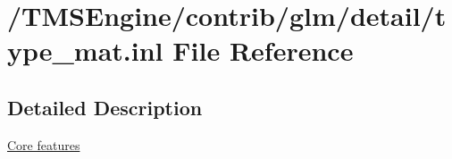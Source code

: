 \hypertarget{type__mat_8inl}{}\section{/\+T\+M\+S\+Engine/contrib/glm/detail/type\+\_\+mat.inl File Reference}
\label{type__mat_8inl}


\subsection{Detailed Description}
\hyperlink{group__core}{Core features} 